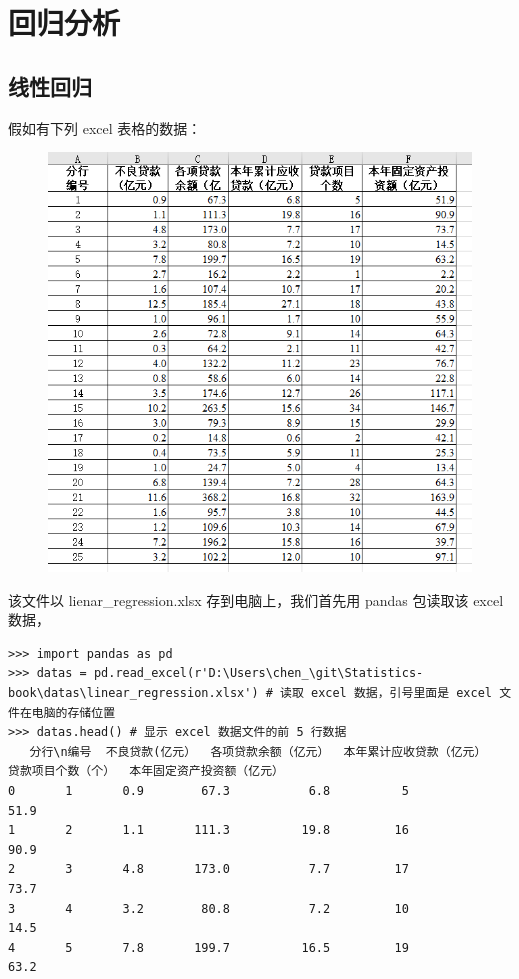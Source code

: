 \chapter{回归分析}

\section{线性回归}

假如有下列 excel 表格的数据：

\begin{figure}[ht]
  \centering
  \includegraphics{figure/linear_regression.png}
\end{figure}

该文件以 lienar\_regression.xlsx 存到电脑上，我们首先用 pandas 包读取该 excel 数据，

\begin{lstlisting}[Language=Python]
>>> import pandas as pd
>>> datas = pd.read_excel(r'D:\Users\chen_\git\Statistics-book\datas\linear_regression.xlsx') # 读取 excel 数据，引号里面是 excel 文件在电脑的存储位置
>>> datas.head() # 显示 excel 数据文件的前 5 行数据
   分行\n编号  不良贷款(亿元）  各项贷款余额（亿元）  本年累计应收贷款（亿元）  贷款项目个数（个）  本年固定资产投资额（亿元）
0       1       0.9        67.3           6.8          5           51.9
1       2       1.1       111.3          19.8         16           90.9
2       3       4.8       173.0           7.7         17           73.7
3       4       3.2        80.8           7.2         10           14.5
4       5       7.8       199.7          16.5         19           63.2

\end{lstlisting}

